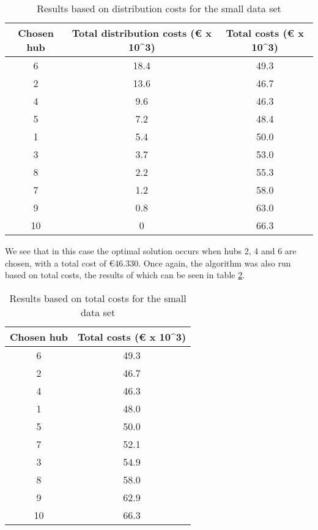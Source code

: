 \documentclass{article}
\begin{document}
\begin{table}[h]
    \centering
    \begin{tabular}{||c|c|c||}
        \hline
        Chosen hub & Total distribution costs (€ x 10^3)& Total costs (€ x 10^3)  \\
        \hline
        \hline
        6 & 18.4 & 49.3 \\
        \hline
        2 & 13.6 & 46.7 \\
        \hline
        4 & 9.6 & 46.3 \\
        \hline
        5 & 7.2 & 48.4 \\
        \hline
        1 & 5.4 & 50.0 \\
        \hline
        3 & 3.7 & 53.0 \\
        \hline
        8 & 2.2 & 55.3 \\
        \hline
        7 & 1.2 & 58.0 \\
        \hline
        9 & 0.8 & 63.0 \\
        \hline
        10 & 0 & 66.3 \\
        \hline
    \end{tabular}
    \caption{Results based on distribution costs for the small data set}
    \label{DistAlgSmall1}
\end{table}

We see that in this case the optimal solution occurs when hubs 2, 4 and 6 are chosen, with a total cost of €46.330.
Once again, the algorithm was also run based on total costs, the results of which can be seen in table \ref{DistAlgSmall2}.

\begin{table}[h]
    \centering
    \begin{tabular}{||c|c||}
    \hline
        Chosen hub & Total costs (€ x 10^3) \\
        \hline
        \hline
        6 & 49.3 \\
        \hline
        2 & 46.7 \\
        \hline
        4 & 46.3 \\
        \hline
        1 & 48.0 \\
        \hline
        5 & 50.0 \\
        \hline
        7 & 52.1 \\
        \hline
        3 & 54.9 \\
        \hline
        8 & 58.0 \\
        \hline
        9 & 62.9 \\
        \hline
        10 & 66.3 \\
        \hline
    \end{tabular}
    \caption{Results based on total costs for the small data set}
    \label{DistAlgSmall2}
\end{table}
\end{document}
